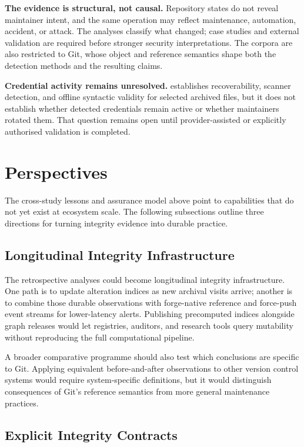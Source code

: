 \textbf{The evidence is structural, not causal.}
Repository states do not reveal maintainer intent, and the same operation may reflect maintenance, automation, accident, or attack.
The analyses classify what changed; case studies and external validation are required before stronger security interpretations.
The corpora are also restricted to Git, whose object and reference semantics shape both the detection methods and the resulting claims.

\textbf{Credential activity remains unresolved.}
 establishes recoverability, scanner detection, and offline syntactic validity for selected archived files, but it does not establish whether detected credentials remain active or whether maintainers rotated them.
That question remains open until provider-assisted or explicitly authorised validation is completed.

\section{Perspectives}
\label{sec:concl-perspectives}

The cross-study lessons and assurance model above point to capabilities that do not yet exist at ecosystem scale.
The following subsections outline three directions for turning integrity evidence into durable practice.

\subsection{Longitudinal Integrity Infrastructure}
\label{subsec:concl-future-observability}

The retrospective analyses could become longitudinal integrity infrastructure.
One path is to update alteration indices as new archival visits arrive; another is to combine those durable observations with forge-native reference and force-push event streams for lower-latency alerts.
Publishing precomputed indices alongside graph releases would let registries, auditors, and research tools query mutability without reproducing the full computational pipeline.

A broader comparative programme should also test which conclusions are specific to Git.
Applying equivalent before-and-after observations to other version control systems would require system-specific definitions, but it would distinguish consequences of Git's reference semantics from more general maintenance practices.

\subsection{Explicit Integrity Contracts}
\label{subsec:concl-future-detection}

